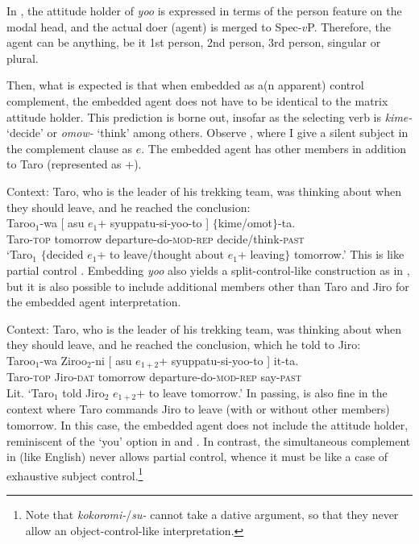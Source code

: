 \documentclass[output=paper]{langsci/langscibook}
\begin{document}
In , the attitude holder of \textit{yoo} is expressed in terms of the person feature on the modal head, and the actual doer (agent) is merged to Spec-$v$P. Therefore, the agent can be anything, be it 1st person, 2nd person, 3rd person, singular or plural.

Then, what is expected is that when embedded as a(n apparent) control complement, the embedded agent does not have to be identical to the matrix attitude holder. This prediction is borne out, insofar as the selecting verb is \textit{kime-} `decide' or \textit{omow-} `think' among others. Observe , where I give a silent subject in the complement clause as $e$. The embedded agent has other members in addition to Taro (represented as +).

\ea\label{shimamu9} Context: Taro, who is the leader of his trekking team, was thinking about when they should leave, and he reached the conclusion:\\
\gll Taroo$_1$-wa [ asu $e_1$+ syuppatu-si-yoo-to ] $\{$kime/omot$\}$-ta.\\
Taro-\textsc{top} {} tomorrow {} departure-do-\textsc{mod-rep} {} \phantom{$\{$}decide/think-\textsc{past}\\
\glt `Taro$_1$ $\{$decided $e_1$+ to leave/thought about $e_1$+ leaving$\}$ tomorrow.'
\z
This is like partial control \citep[cf.][]{landau2000}. Embedding \textit{yoo} also yields a split-control-like construction as in , but it is also possible to include additional members other than Taro and Jiro for the embedded agent interpretation.

\ea\label{shimamu10} Context: Taro, who is the leader of his trekking team, was thinking about when they should leave, and he reached the conclusion, which he told to Jiro:\\
\gll Taroo$_1$-wa Ziroo$_2$-ni [ asu $e_{1+2}$+ syuppatu-si-yoo-to ] it-ta.\\
Taro-\textsc{top} Jiro-\textsc{dat} {} tomorrow {} departure-do-\textsc{mod-rep} {} say-\textsc{past}\\
\glt Lit. `Taro$_1$ told Jiro$_2$ $e_{1+2}$+ to leave tomorrow.'
\z
In passing,  is also fine in the context where Taro commands Jiro to leave (with or without other members) tomorrow. In this case, the embedded agent does not include the attitude holder, reminiscent of the `you' option in  and . In contrast, the simultaneous complement in  (like English) never allows partial control, whence it must be like a case of exhaustive subject control.\footnote{Note that \textit{kokoromi-}/\textit{su-} cannot take a dative argument, so that they never allow an object-control-like interpretation.}
\end{document}
